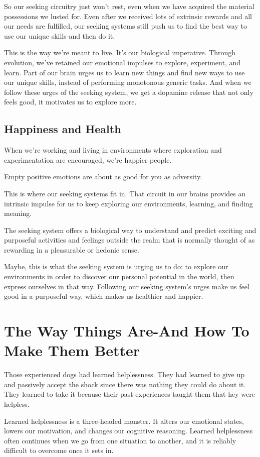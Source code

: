 \documentclass[ebook,12pt,oneside,openany]{memoir}
\begin{document}
So our seeking circuitry just won't rest, even when we have acquired the material possessions we lusted for.
Even after we received lots of extrinsic rewards and all our needs are fulfilled, our seeking systems still push us to find the best way to use our unique skills-and then do it.

This is the way we're meant to live. It's our biological imperative.
Through evolution, we've retained our emotional impulses to explore, experiment, and learn.
Part of our brain urges us to learn new things and find new ways to use our unique skills, instead of performing monotonous generic tasks.
And when we follow these urges of the seeking system, we get a dopamine release that not only feels good, it motivates us to explore more.

\subsection{Happiness and Health}
When we're working and living in environments where exploration and experimentation are encouraged, we're happier people.

Empty positive emotions are about as good for you as adversity.

This is where our seeking systems fit in. That circuit in our brains provides an intrinsic impulse for us 
to keep exploring our environments, learning, and finding meaning.

The seeking system offers a biological way to understand and predict exciting and purposeful activities and feelings
outside the realm that is normally thought of as rewarding in a pleasurable or hedonic sense.

Maybe, this is what the seeking system is urging us to do: to explore our environments in order to discover our personal potential
in the world, then express ourselves in that way.
Following our seeking system's urges make us feel good in a purposeful way, which makes us healthier and happier.

\section{The Way Things Are-And How To Make Them Better}
Those experienced dogs had learned helplessness. They had learned to give up and passively accept the shock 
since there was nothing they could do about it. 
They learned to take it because their past experiences taught them that hey were helpless.

Learned helplessness is a three-headed monster. It alters our emotional states, lowers our motivation,
and changes our cognitive reasoning.
Learned helplessness often continues when we go from one situation to another, and it is reliably difficult 
to overcome once it sets in. 
\end{document}
